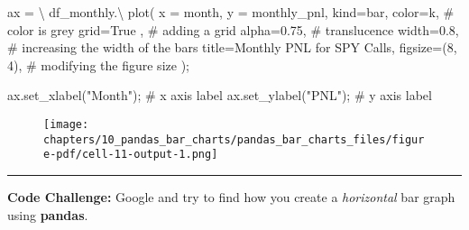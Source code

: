 \documentclass[
  letterpaper,
  DIV=11,
  numbers=noendperiod]{scrreprt}
\newenvironment{Shaded}{\begin{snugshade}}{\end{snugshade}}
\newcommand{\CommentTok}[1]{\textcolor[rgb]{0.37,0.37,0.37}{#1}}
\newcommand{\DecValTok}[1]{\textcolor[rgb]{0.68,0.00,0.00}{#1}}
\newcommand{\FloatTok}[1]{\textcolor[rgb]{0.68,0.00,0.00}{#1}}
\newcommand{\NormalTok}[1]{\textcolor[rgb]{0.00,0.23,0.31}{#1}}
\newcommand{\OperatorTok}[1]{\textcolor[rgb]{0.37,0.37,0.37}{#1}}
\newcommand{\StringTok}[1]{\textcolor[rgb]{0.13,0.47,0.30}{#1}}
\newcommand{\VariableTok}[1]{\textcolor[rgb]{0.07,0.07,0.07}{#1}}
\begin{document}
\begin{Shaded}
\begin{Highlighting}[]
\NormalTok{ax }\OperatorTok{=} \OperatorTok{\textbackslash{}}
\NormalTok{    df\_monthly.}\OperatorTok{\textbackslash{}}
\NormalTok{        plot(}
\NormalTok{            x }\OperatorTok{=} \StringTok{\textquotesingle{}month\textquotesingle{}}\NormalTok{,}
\NormalTok{            y }\OperatorTok{=} \StringTok{\textquotesingle{}monthly\_pnl\textquotesingle{}}\NormalTok{,}
\NormalTok{            kind}\OperatorTok{=}\StringTok{\textquotesingle{}bar\textquotesingle{}}\NormalTok{,}
\NormalTok{            color}\OperatorTok{=}\StringTok{\textquotesingle{}k\textquotesingle{}}\NormalTok{, }\CommentTok{\# color is grey}
\NormalTok{            grid}\OperatorTok{=}\VariableTok{True}\NormalTok{ , }\CommentTok{\# adding a grid}
\NormalTok{            alpha}\OperatorTok{=}\FloatTok{0.75}\NormalTok{, }\CommentTok{\# translucence}
\NormalTok{            width}\OperatorTok{=}\FloatTok{0.8}\NormalTok{, }\CommentTok{\# increasing the width of the bars}
\NormalTok{            title}\OperatorTok{=}\StringTok{\textquotesingle{}Monthly PNL for SPY Calls\textquotesingle{}}\NormalTok{,}
\NormalTok{            figsize}\OperatorTok{=}\NormalTok{(}\DecValTok{8}\NormalTok{, }\DecValTok{4}\NormalTok{), }\CommentTok{\# modifying the figure size}
\NormalTok{        )}\OperatorTok{;}

\NormalTok{ax.set\_xlabel(}\StringTok{"Month"}\NormalTok{)}\OperatorTok{;} \CommentTok{\# x axis label}
\NormalTok{ax.set\_ylabel(}\StringTok{"PNL"}\NormalTok{)}\OperatorTok{;}   \CommentTok{\# y axis label}
\end{Highlighting}
\end{Shaded}

\begin{figure}[H]

{\centering \texttt{[image: chapters/10\_pandas\_bar\_charts/pandas\_bar\_charts\_files/figure-pdf/cell-11-output-1.png]}

}

\end{figure}

\begin{center}\rule{0.5\linewidth}{0.5pt}\end{center}

\textbf{Code Challenge:} Google and try to find how you create a
\emph{horizontal} bar graph using \textbf{pandas}.
\end{document}
